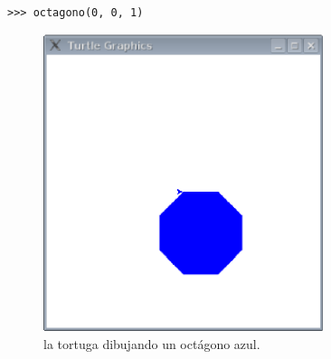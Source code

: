 \begin{listing}
\begin{verbatim}
>>> octagono(0, 0, 1)
\end{verbatim}
\end{listing}

\begin{figure}
\begin{center}
\includegraphics[width=82mm]{figure49.eps}
\end{center}
\caption{la tortuga dibujando un octágono azul.}\label{fig49}
\end{figure}
\newpage
